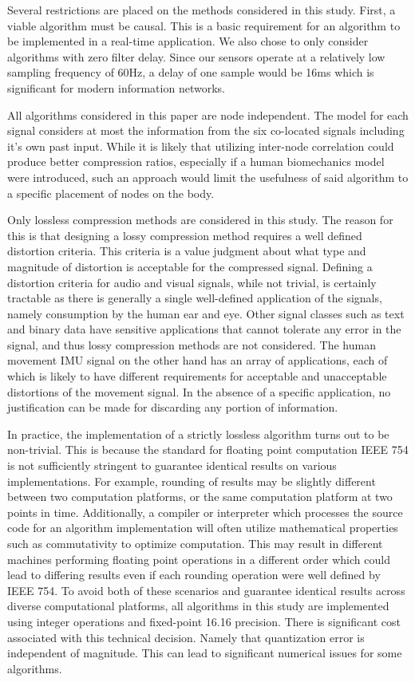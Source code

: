 \documentclass[journal]{IEEEtran}
\begin{document}
Several restrictions are placed on the methods considered in this study. First, a viable algorithm must be causal. This is a basic requirement for an algorithm to be implemented in a real-time application. We also chose to only consider algorithms with zero filter delay. Since our sensors operate at a relatively low sampling frequency of 60Hz, a delay of one sample would be 16ms which is significant for modern information networks.

All algorithms considered in this paper are node independent. The model for each signal considers at most the information from the six co-located signals including it's own past input. While it is likely that utilizing inter-node correlation could produce better compression ratios, especially if a human biomechanics model were introduced, such an approach would limit the usefulness of said algorithm to a specific placement of nodes on the body.

Only lossless compression methods are considered in this study. The reason for this is that designing a lossy compression method requires a well defined distortion criteria\cite{Sayood2006}. This criteria is a value judgment about what type and magnitude of distortion is acceptable for the compressed signal. Defining a distortion criteria for audio and visual signals, while not trivial, is certainly tractable as there is generally a single well-defined application of the signals, namely consumption by the human ear and eye\cite{Limb1979}\cite{Painter2000}. Other signal classes such as text and binary data have sensitive applications that cannot tolerate any error in the signal, and thus lossy compression methods are not considered. The human movement IMU signal on the other hand has an array of applications, each of which is likely to have different requirements for acceptable and unacceptable distortions of the movement signal. In the absence of a specific application, no justification can be made for discarding any portion of information.

In practice, the implementation of a strictly lossless algorithm turns out to be non-trivial. This is because the standard for floating point computation IEEE 754 \cite{Society2008} is not sufficiently stringent to guarantee identical results on various implementations. For example, rounding of results may be slightly different between two computation platforms, or the same computation platform at two points in time. Additionally, a compiler or interpreter which processes the source code for an algorithm implementation will often utilize mathematical properties such as commutativity to optimize computation. This may result in different machines performing floating point operations in a different order which could lead to differing results even if each rounding operation were well defined by IEEE 754. To avoid both of these scenarios and guarantee identical results across diverse computational platforms, all algorithms in this study are implemented using integer operations and fixed-point 16.16 precision. There is significant cost associated with this technical decision. Namely that quantization error is independent of magnitude. This can lead to significant numerical issues for some algorithms.
\end{document}
